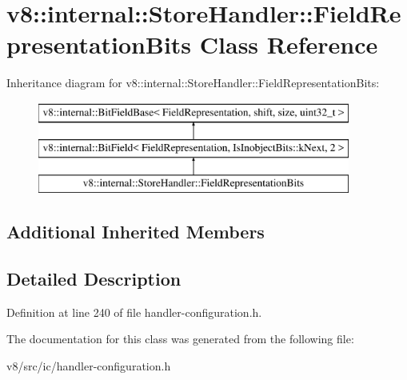 \hypertarget{classv8_1_1internal_1_1StoreHandler_1_1FieldRepresentationBits}{}\section{v8\+:\+:internal\+:\+:Store\+Handler\+:\+:Field\+Representation\+Bits Class Reference}
\label{classv8_1_1internal_1_1StoreHandler_1_1FieldRepresentationBits}
Inheritance diagram for v8\+:\+:internal\+:\+:Store\+Handler\+:\+:Field\+Representation\+Bits\+:\begin{figure}[H]
\begin{center}
\leavevmode
\includegraphics[height=3.000000cm]{classv8_1_1internal_1_1StoreHandler_1_1FieldRepresentationBits}
\end{center}
\end{figure}
\subsection*{Additional Inherited Members}


\subsection{Detailed Description}


Definition at line 240 of file handler-\/configuration.\+h.



The documentation for this class was generated from the following file\+:\begin{DoxyCompactItemize}
\item 
v8/src/ic/handler-\/configuration.\+h\end{DoxyCompactItemize}
